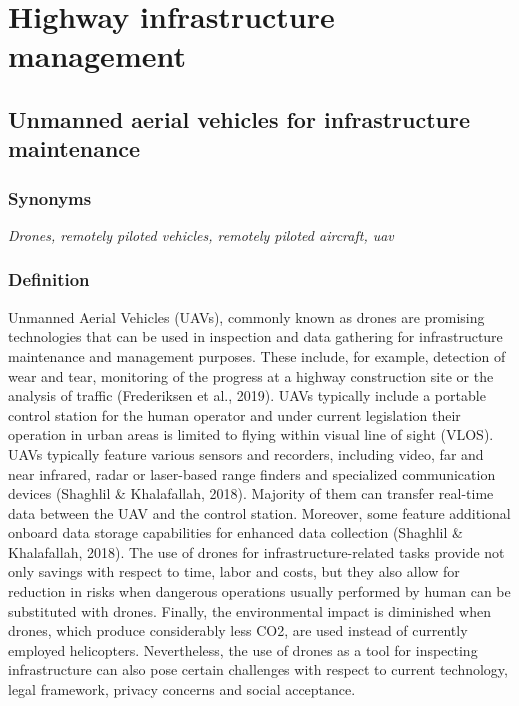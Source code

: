 \documentclass[
]{book}
\begin{document}
\hypertarget{highway}{%
\chapter{Highway infrastructure management}\label{highway}}

\hypertarget{uav}{%
\section{Unmanned aerial vehicles for infrastructure maintenance}\label{uav}}

\hypertarget{synonyms-3}{%
\subsection*{Synonyms}\label{synonyms-3}}

\emph{Drones, remotely piloted vehicles, remotely piloted aircraft, uav}

\hypertarget{definition-4}{%
\subsection*{Definition}\label{definition-4}}

Unmanned Aerial Vehicles (UAVs), commonly known as drones are promising technologies that can be used in inspection and data gathering for infrastructure maintenance and management purposes. These include, for example, detection of wear and tear, monitoring of the progress at a highway construction site or the analysis of traffic (Frederiksen et al., 2019). UAVs typically include a portable control station for the human operator and under current legislation their operation in urban areas is limited to flying within visual line of sight (VLOS). UAVs typically feature various sensors and recorders, including video, far and near infrared, radar or laser-based range finders and specialized communication devices (Shaghlil \& Khalafallah, 2018). Majority of them can transfer real-time data between the UAV and the control station. Moreover, some feature additional onboard data storage capabilities for enhanced data collection (Shaghlil \& Khalafallah, 2018). The use of drones for infrastructure-related tasks provide not only savings with respect to time, labor and costs, but they also allow for reduction in risks when dangerous operations usually performed by human can be substituted with drones. Finally, the environmental impact is diminished when drones, which produce considerably less CO2, are used instead of currently employed helicopters. Nevertheless, the use of drones as a tool for inspecting infrastructure can also pose certain challenges with respect to current technology, legal framework, privacy concerns and social acceptance.
\end{document}

